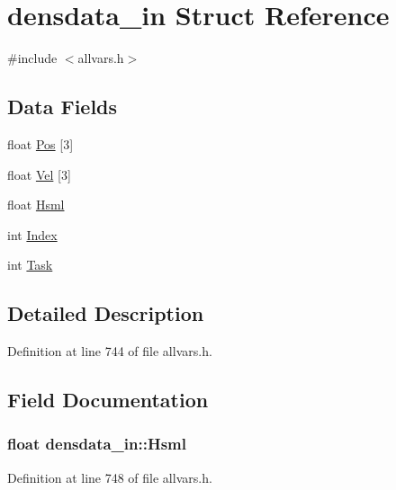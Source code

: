\hypertarget{structdensdata__in}{
\section{densdata\_\-in Struct Reference}
\label{structdensdata__in}
}


{\ttfamily \#include $<$allvars.h$>$}

\subsection*{Data Fields}
\begin{DoxyCompactItemize}
\item 
float \hyperlink{structdensdata__in_a619b6e6d76f91b047119249915527164}{Pos} \mbox{[}3\mbox{]}
\item 
float \hyperlink{structdensdata__in_a8df7f2cfb255b800bbbbb69d674ae4ac}{Vel} \mbox{[}3\mbox{]}
\item 
float \hyperlink{structdensdata__in_a5a572c3fbe7024feabd787fde3bd8689}{Hsml}
\item 
int \hyperlink{structdensdata__in_a1c79a4d4fdcc9e483946193f2d030308}{Index}
\item 
int \hyperlink{structdensdata__in_a010be125c58096f5cd2fec47f210747b}{Task}
\end{DoxyCompactItemize}


\subsection{Detailed Description}


Definition at line 744 of file allvars.h.



\subsection{Field Documentation}
\hypertarget{structdensdata__in_a5a572c3fbe7024feabd787fde3bd8689}{
\subsubsection[{Hsml}]{\setlength{\rightskip}{0pt plus 5cm}float {\bf densdata\_\-in::Hsml}}}
\label{structdensdata__in_a5a572c3fbe7024feabd787fde3bd8689}


Definition at line 748 of file allvars.h.



